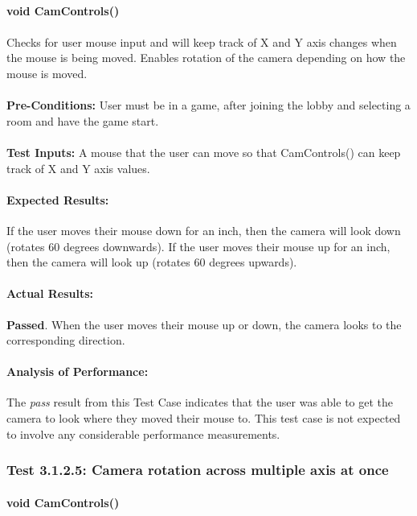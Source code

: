 \documentclass{article}
\begin{document}
    \paragraph{}\textbf{void CamControls()}
    \paragraph{} Checks for user mouse input and will keep track of X and Y axis changes when the mouse is being moved. Enables rotation of the camera depending on how the mouse is moved.
    \paragraph{}\textbf{Pre-Conditions:} User must be in a game, after joining the lobby and selecting a room and have the game start.
    \paragraph{}\textbf{Test Inputs:} A mouse that the user can move so that CamControls() can keep track of X and Y axis values.
    \paragraph{Expected Results:} If the user moves their mouse down for an inch, then the camera will look down (rotates 60 degrees downwards). If the user moves their mouse up for an inch, then the camera will look up (rotates 60 degrees upwards).
    \paragraph{Actual Results:} \textbf{Passed}. When the user moves their mouse up or down, the camera looks to the corresponding direction. 
    \paragraph{Analysis of Performance:} The \emph{pass} result from this Test Case indicates that the user was able to get the camera to look where they moved their mouse to. This test case is not expected to involve any considerable performance measurements. 
    
    \subsubsection{Test 3.1.2.5: Camera rotation across multiple axis at once}
    \paragraph{}\textbf{void CamControls()}
\end{document}
